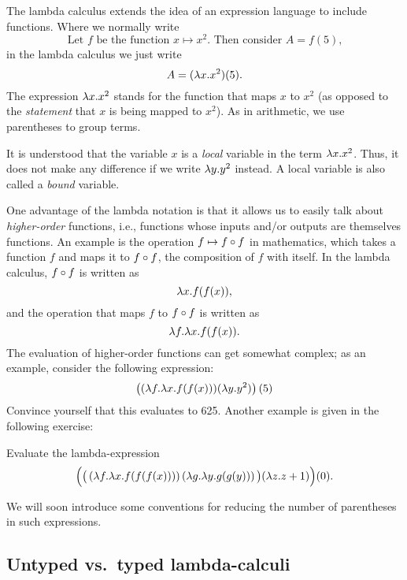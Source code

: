 \documentclass{article}
\begin{document}
The lambda calculus extends the idea of an expression language to
include functions. Where we normally write
\[   \mbox{Let $f$ be the function $x\mapsto x^2$. Then consider $A=f(5)$,}
\]
in the lambda calculus we just write
\[   A = (\lambda x.x^2)(5)  .
\]
The expression $\lambda x.x^2$ stands for the function that maps $x$ to
$x^2$ (as opposed to the {\em statement} that $x$ is being mapped to
$x^2$). As in arithmetic, we use parentheses to group terms.

It is understood that the variable $x$ is a {\em local} variable in
the term $\lambda x.x^2$. Thus, it does not make any difference if we
write $\lambda y.y^2$ instead. A local variable is also called a {\em
  bound} variable.

One advantage of the lambda notation is that it allows us to easily
talk about {\em higher-order} functions, i.e., functions whose inputs
and/or outputs are themselves functions. An example is the operation
$f\mapsto f\circ f$ in mathematics, which takes a function $f$ and
maps it to $f\circ f$, the composition of $f$ with itself. In the lambda
calculus, $f\circ f$ is written as
\[         \lambda x.f(f(x)),   
\]
and the operation that maps $f$ to $f\circ f$ is written as
\[         \lambda f.\lambda x.f(f(x)).
\]
The evaluation of higher-order functions can get somewhat complex; as
an example, consider the following expression:
\[         \left((\lambda f.\lambda x.f(f(x)))(\lambda y.y^2)\right)(5)
\]
Convince yourself that this evaluates to 625. Another example is given
in the following exercise:

\begin{exercise}
Evaluate the lambda-expression
\[        \Big(
          \big(\left(\lambda f.\lambda x.f(f(f(x)))\right)
          \left(\lambda g.\lambda y.g(g(y))\right)\big)
          (\lambda z.z+1)\Big)(0).
\]
\end{exercise}

We will soon introduce some conventions for reducing the number of
parentheses in such expressions.

\subsection{Untyped vs.\ typed lambda-calculi}
\end{document}
